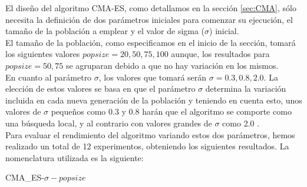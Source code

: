 El diseño del algoritmo CMA-ES, como detallamos en la sección \ref{sec:CMA}, sólo necesita la definición de dos parámetros iniciales para comenzar su ejecución, el tamaño de la población a emplear y el valor de sigma ($\sigma$) inicial. \\
El tamaño de la población, como especificamos en el inicio de la sección, tomará los siguientes valores $popsize = 20, 50, 75, 100$ aunque, los resultados para $popsize = 50, 75$ se agruparan debido a que no hay variación en los mismos. \\
En cuanto al parámetro $\sigma$, los valores que tomará serán $\sigma = 0.3, 0.8, 2.0$. La elección de estos valores se basa en que el parámetro $\sigma$ determina la variación incluida en cada nueva generación de la población y teniendo en cuenta esto, unos valores de $\sigma$ pequeños como 0.3 y 0.8 harán que el algoritmo se comporte como una búsqueda local, y al contrario con valores grandes de $\sigma$ como 2.0 \cite{CMA1}. \\

Para evaluar el rendimiento del algoritmo variando estos dos parámetros, hemos realizado un total de 12 experimentos, obteniendo los siguientes resultados. La nomenclatura utilizada es la siguiente: \\
\centerline{CMA\_ES-$\sigma-popsize$}
\begin{table}[!ht]
  \caption{Comparativa del algoritmo CMA-ES.}
\end{table}

